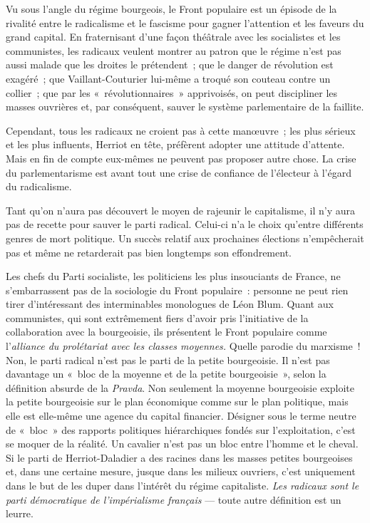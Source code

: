 \documentclass[french,twoside]{book} %
\begin{document}
Vu sous l’angle du régime bourgeois, le Front populaire est un épisode de la rivalité entre le radicalisme et le fascisme pour gagner l’attention et les faveurs du grand capital. En fraternisant d’une façon théâtrale avec les socialistes et les communistes, les radicaux veulent montrer au patron que le régime n’est pas aussi malade que les droites le prétendent ; que le danger de révolution est exagéré ; que Vaillant-Couturier lui-même a troqué son couteau contre un collier ; que par les « révolutionnaires » apprivoisés, on peut discipliner les masses ouvrières et, par conséquent, sauver le système parlementaire de la faillite.\par
Cependant, tous les radicaux ne croient pas à cette manœuvre ; les plus sérieux et les plus influents, Herriot en tête, préfèrent adopter une attitude d’attente. Mais en fin de compte eux-mêmes ne peuvent pas proposer autre chose. La crise du parlementarisme est avant tout une crise de confiance de l’électeur à l’égard du radicalisme.\par
Tant qu’on n’aura pas découvert le moyen de rajeunir  le capitalisme, il n’y aura pas de recette pour sauver le parti radical. Celui-ci n’a le choix qu’entre différents genres de mort politique. Un succès relatif aux prochaines élections n’empêcherait pas et même ne retarderait pas bien longtemps son effondrement.\par
Les chefs du Parti socialiste, les politiciens les plus insouciants de France, ne s’embarrassent pas de la sociologie du Front populaire : personne ne peut rien tirer d’intéressant des interminables monologues de Léon Blum. Quant aux communistes, qui sont extrêmement fiers d’avoir pris l’initiative de la collaboration avec la bourgeoisie, ils présentent le Front populaire comme l’\emph{alliance du prolétariat avec les classes moyennes.} Quelle parodie du marxisme ! Non, le parti radical n’est pas le parti de la petite bourgeoisie. Il n’est pas davantage un « bloc de la moyenne et de la petite bourgeoisie », selon la définition absurde de la \emph{Pravda}. Non seulement la moyenne bourgeoisie exploite la petite bourgeoisie sur le plan économique comme sur le plan politique, mais elle est elle-même une agence du capital financier. Désigner sous le terme neutre de « bloc » des rapports politiques hiérarchiques fondés sur l’exploitation, c’est se moquer de la réalité. Un cavalier n’est pas un bloc entre l’homme et le cheval. Si le parti de Herriot-Daladier a des racines dans les masses petites bourgeoises et, dans une certaine mesure, jusque dans les milieux ouvriers, c’est uniquement dans le but de les duper dans l’intérêt du régime capitaliste. \emph{Les radicaux sont le parti démocratique de l’impérialisme français} — toute autre définition est un leurre.\par
\end{document}
